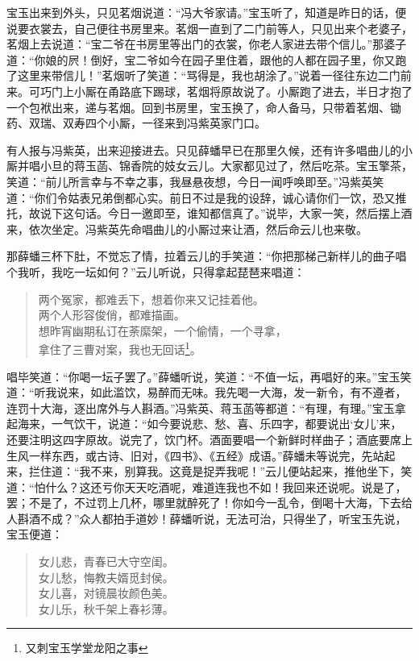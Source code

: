 \documentclass[12pt,oneside]{book}
\newenvironment{shici}{%
\begin{verse}%
\centering\large\hspace{12pt}}%
{\end{verse}}
\begin{document}
宝玉出来到外头，只见茗烟说道：“冯大爷家请。”宝玉听了，知道是昨日的话，便说要衣裳去，自己便往书房里来。茗烟一直到了二门前等人，只见出来个老婆子，茗烟上去说道：“宝二爷在书房里等出门的衣裳，你老人家进去带个信儿。”那婆子道：“你娘的屄！倒好，宝二爷如今在园子里住着，跟他的人都在园子里，你又跑了这里来带信儿！”茗烟听了笑道：“骂得是，我也胡涂了。”说着一径往东边二门前来。可巧门上小厮在甬路底下踢球，茗烟将原故说了。小厮跑了进去，半日才抱了一个包袱出来，递与茗烟。回到书房里，宝玉换了，命人备马，只带着茗烟、锄药、双瑞、双寿四个小厮，一径来到冯紫英家门口。

有人报与冯紫英，出来迎接进去。只见薛蟠早已在那里久候，还有许多唱曲儿的小厮并唱小旦的蒋玉菡、锦香院的妓女云儿。大家都见过了，然后吃茶。宝玉擎茶，笑道：“前儿所言幸与不幸之事，我昼悬夜想，今日一闻呼唤即至。”冯紫英笑道：“你们令姑表兄弟倒都心实。前日不过是我的设辞，诚心请你们一饮，恐又推托，故说下这句话。今日一邀即至，谁知都信真了。”说毕，大家一笑，然后摆上酒来，依次坐定。冯紫英先命唱曲儿的小厮过来让酒，然后命云儿也来敬。

那薛蟠三杯下肚，不觉忘了情，拉着云儿的手笑道：“你把那梯己新样儿的曲子唱个我听，我吃一坛如何？”云儿听说，只得拿起琵琶来唱道：

\begin{shici}
两个冤家，都难丢下，想着你来又记挂着他。\\
两个人形容俊俏，都难描画。\\
想昨宵幽期私订在荼縻架，一个偷情，一个寻拿，\\
拿住了三曹对案，我也无回话\footnote{又刺宝玉学堂龙阳之事}。
\end{shici}


唱毕笑道：“你喝一坛子罢了。”薛蟠听说，笑道：“不值一坛，再唱好的来。”宝玉笑道：“听我说来，如此滥饮，易醉而无味。我先喝一大海，发一新令，有不遵者，连罚十大海，逐出席外与人斟酒。”冯紫英、蒋玉菡等都道：“有理，有理。”宝玉拿起海来，一气饮干，说道：“如今要说悲、愁、喜、乐四字，都要说出‘女儿’来，还要注明这四字原故。说完了，饮门杯。酒面要唱一个新鲜时样曲子；酒底要席上生风一样东西，或古诗、旧对，《四书》、《五经》成语。”薛蟠未等说完，先站起来，拦住道：“我不来，别算我。这竟是捉弄我呢！”云儿便站起来，推他坐下，笑道：“怕什么？这还亏你天天吃酒呢，难道连我也不如！我回来还说呢。说是了，罢；不是了，不过罚上几杯，哪里就醉死了！你如今一乱令，倒喝十大海，下去给人斟酒不成？”众人都拍手道妙！薛蟠听说，无法可治，只得坐了，听宝玉先说，宝玉便道：

\begin{shici}
女儿悲，青春已大守空闺。\\
女儿愁，悔教夫婿觅封侯。\\
女儿喜，对镜晨妆颜色美。\\
女儿乐，秋千架上春衫薄。
\end{shici}
\end{document}
